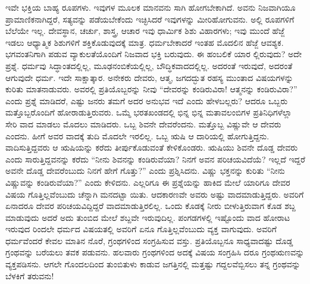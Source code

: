 ಇವೇ ಭಕ್ತಿಯ ಬಾಹ್ಯ ರೂಪಗಳು. ಇವುಗಳ ಮೂಲಕ ಮಾನವನು ಸಾಗಿ ಹೋಗಬೇಕಾಗಿದೆ. ಅವನು ನಿಜವಾಗಿಯೂ ಪ್ರಾಮಾಣಿಕನಾಗಿದ್ದರೆ, ಸತ್ಯವನ್ನು ಪಡೆಯಬೇಕೆಂದು ಇಚ್ಛಿಸಿದರೆ ಇವುಗಳನ್ನು ಮೀರಿಹೋಗುವನು. ಅಲ್ಲಿ ರೂಪಗಳಿಗೆ ಬೆಲೆಯೇ ಇಲ್ಲ. ದೇವಸ್ಥಾನ, ಚರ್ಚು, ಶಾಸ್ತ್ರ, ಆಚಾರ ಇವು ಧಾರ್ಮಿಕ ಶಿಶು ವಿಹಾರಗಳು; ಇವು ಮುಂದೆ ಹೆಜ್ಜೆ ಇಡಲು ಆಧ್ಯಾತ್ಮಿಕ ಶಿಶುಗಳಿಗೆ ಶಕ್ತಿಕೊಡುವುದಕ್ಕೆ ಮಾತ್ರ. ಧರ್ಮಬೇಕಾದರೆ ಇಂತಹ ಮೊದಲಿನ ಹೆಜ್ಜೆ ಆವಶ್ಯಕ. ಭಗವಂತನಿಗಾಗಿ ಪಡುವ ವ್ಯಾಕುಲತೆಯೊಂದಿಗೆ ನಿಜವಾದ ಭಕ್ತಿ ಬರುವುದು. ಈ ಹಂಬಲಿಕೆ ಯಾರ ಲ್ಲಿರುವುದು? ಅದೇ ಪ್ರಶ್ನೆ. ಧರ್ಮವು ಸಿದ್ಧಾಂತದಲ್ಲಿಲ್ಲ, ಮೂಢನಂಬಿಕೆಯಲ್ಲಿಲ್ಲ, ಬೌದ್ಧಿಕವಾದದಲ್ಲಿಲ್ಲ. ಅದರಂತೆ ಇರುವುದೆ, ಅದರಂತೆ ಆಗುವುದೇ ಧರ್ಮ. ಇದೇ ಸಾಕ್ಷಾತ್ಕಾರ. ಅನೇಕರು ದೇವರು, ಆತ್ಮ, ಜಗದದ್ಭುತ ರಹಸ್ಯ ಮುಂತಾದ ವಿಷಯಗಳನ್ನು ಕುರಿತು ಮಾತನಾಡುವರು. ಅವರಲ್ಲಿ ಪ್ರತಿಯೊಬ್ಬರನ್ನು ನೀವು “ದೇವರನ್ನು ಕಂಡಿರುವಿರಾ! ಆತ್ಮನನ್ನು ಕಂಡಿರುವಿರಾ?” ಎಂದು ಪ್ರಶ್ನೆ ಮಾಡಿದರೆ, ಎಷ್ಟು ಜನರು ತಮಗೆ ಅದರ ಅನುಭವ ಇದೆ ಎಂದು ಹೇಳಬಲ್ಲರು? ಆದರೂ ಒಬ್ಬರು ಮತ್ತೊಬ್ಬರೊಂದಿಗೆ ಹೋರಾಡುತ್ತಿರುವರು. ಒಮ್ಮೆ ಭರತಖಂಡದಲ್ಲಿ ಭಿನ್ನ ಭಿನ್ನ ಮತಾವಲಂಬಿಗಳ ಪ್ರತಿನಿಧಿಗಳೆಲ್ಲಾ ಸೇರಿ ವಾದ ಮಾಡಲು ಮೊದಲು ಮಾಡಿದರು. ಒಬ್ಬ ಶಿವನೇ ದೇವರೆಂದನು. ಮತ್ತೊಬ್ಬ ವಿಷ್ಣುವೇ ಆ ದೇವರು ಎಂದನು. ಹೀಗೆ ಅವರ ವಾದಕ್ಕೆ ತುದಿ ಮೊದಲೇ ಇರಲಿಲ್ಲ. ಒಬ್ಬ ಋಷಿ ಆ ದಾರಿಯಲ್ಲಿ ಹೋಗುತ್ತಿದ್ದನು. ವಾದಿಸುತ್ತಿದ್ದವರು ಆ ಋಷಿಯನ್ನು ಕರೆದು ತೀರ್ಪುಕೊಡುವಂತೆ ಕೇಳಿಕೊಂಡರು. ಋಷಿಯು ಶಿವನೇ ದೊಡ್ಡ ದೇವರು ಎಂದು ಸಾರುತ್ತಿದ್ದವನನ್ನು ಕರೆದು “ನೀನು ಶಿವನನ್ನು ಕಂಡಿರುವೆಯಾ? ನಿನಗೆ ಅವನ ಪರಿಚಯವಿದೆಯೆ? ಇಲ್ಲದೆ ಇದ್ದರೆ ಅವನೇ ದೊಡ್ಡ ದೇವರೆಂಬುದು ನಿನಗೆ ಹೇಗೆ ಗೊತ್ತು?” ಎಂದು ಪ್ರಶ್ನಿಸಿದನು. ವಿಷ್ಣು ಭಕ್ತನನ್ನು ಕುರಿತು “ನೀನು ವಿಷ್ಣುವನ್ನು ಕಂಡಿರುವೆಯಾ?” ಎಂದು ಕೇಳಿದನು. ಎಲ್ಲರಿಗೂ ಈ ಪ್ರಶ್ನೆಯನ್ನು ಹಾಕಿದ ಮೇಲೆ ಯಾರಿಗೂ ದೇವರ ವಿಷಯ ಗೊತ್ತಿಲ್ಲವೆಂಬುದು ಚೆನ್ನಾಗಿ ಮನದಟ್ಟಾ ಯಿತು. ಆದಕಾರಣವೇ ಅವರು ಅಷ್ಟು ವಾದಮಾಡುತ್ತಿದ್ದರು. ಅವರಿಗೆ ಏನಾದರೂ ದೇವರ ಪರಿಚಯವಿದ್ದಿದ್ದರೆ ವಾದಮಾಡುತ್ತಿರಲಿಲ್ಲ. ಒಂದು ಕೊಡಕ್ಕೆ ನೀರು ಬೀಳುತ್ತಿರುವಾಗ ಕೊಡ ಶಬ್ದ ಮಾಡುವುದು ಅದರೆ ಅದು ತುಂಬಿದ ಮೇಲೆ ಶಬ್ದವೇ ಇರುವುದಿಲ್ಲ. ಪಂಗಡಗಳಲ್ಲಿ ಇಷ್ಟೊಂದು ವಾದ ಹೋರಾಟ ಇರುವುದ ರಿಂದಲೇ ಧರ್ಮದ ವಿಷಯತಲ್ಲಿ ಅವರಿಗೆ ಏನೂ ಗೊತ್ತಿಲ್ಲವೆಂಬುದು ವ್ಯಕ್ತ ವಾಗುವುದು. ಅವರಿಗೆ ಧರ್ಮವೆಂದರೆ ಕೇವಲ ಮಾತಿನ ನೊರೆ, ಗ್ರಂಥಗಳಿಂದ ಸಂಗ್ರಹಿಸುವ ವಸ್ತು. ಪ್ರತಿಯೊಬ್ಬನೂ ಸಾಧ್ಯವಾದಷ್ಟು ದೊಡ್ಡ ಗ್ರಂಥವನ್ನು ಬರೆಯಲು ತವಕ ಪಡುವನು. ಹಲವಾರು ಗ್ರಂಥಗಳಿಂದ ಅದಕ್ಕೆ ವಿಷಯ ಸಂಗ್ರಹಿಸಿ ದರೂ ಗ್ರಂಥಋಣವನ್ನು ವ್ಯಕ್ತಪಡಿಸನು. ಆಗಲೇ ಗೊಂದಲದಿಂದ ತುಂಬಿತುಳು ಕಾಡುವ ಜಗತ್ತಿನಲ್ಲಿ ಮತ್ತಷ್ಟು ಗದ್ದಲವೆಬ್ಬಿಸಲು ತನ್ನ ಗ್ರಂಥವನ್ನು ಬೆಳಕಿಗೆ ತರುವನು!

